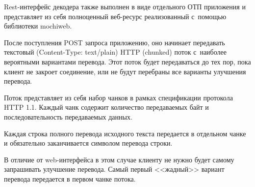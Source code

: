 Rest-интерфейс декодера также выполнен в виде отдельного ОТП приложения и представляет
из себя полноценный веб-ресурс реализованный с~помощью библиотеки mochiweb.

После поступления POST запроса приложению, оно начинает 
передавать текстовый (Content-Type: text/plain) 
HTTP (chunked) поток с~наиболее вероятными вариантами перевода. 
Этот поток будет передаваться до тех пор, 
пока клиент не закроет соединение, 
или не будут перебраны все варианты улучшения перевода.

Поток представляет из себя набор чанков в рамках спецификации протокола HTTP 1.1.
Каждый чанк содержит количество передаваемых байт и последовательность передаваемых данных.

Каждая строка полного перевода исходного текста передается 
в отдельном чанке и обязательно заканчивается 
символом перевода строки.

В отличие от web-интерфейса в этом случае клиенту не нужно будет самому
запрашивать улучшение перевода. Самый первый <<жадный>> вариант перевода 
передается в первом чанке потока.

\pagebreak

